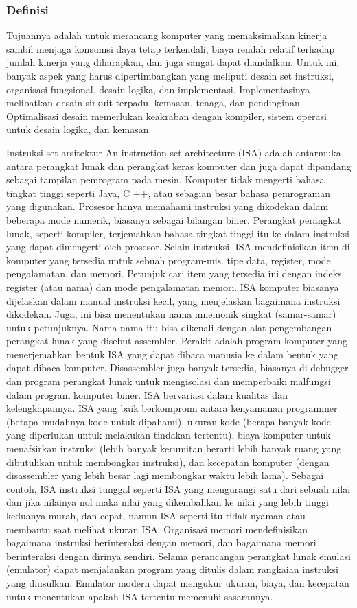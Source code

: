 {\subsubsection{Definisi}
Tujuannya adalah untuk merancang komputer yang memaksimalkan kinerja sambil menjaga konsumsi daya tetap terkendali, biaya rendah relatif terhadap jumlah kinerja yang diharapkan, dan juga sangat dapat diandalkan. Untuk ini, banyak aspek yang harus dipertimbangkan yang meliputi desain set instruksi, organisasi fungsional, desain logika, dan implementasi. Implementasinya melibatkan desain sirkuit terpadu, kemasan, tenaga, dan pendinginan. Optimalisasi desain memerlukan keakraban dengan kompiler, sistem operasi untuk desain logika, dan kemasan.

Instruksi set arsitektur 
An instruction set architecture (ISA) adalah antarmuka antara perangkat lunak dan perangkat keras komputer dan juga dapat dipandang sebagai tampilan pemrogram pada mesin. Komputer tidak mengerti bahasa tingkat tinggi seperti Java, C ++, atau sebagian besar bahasa pemrograman yang digunakan. Prosesor hanya memahami instruksi yang dikodekan dalam beberapa mode numerik, biasanya sebagai bilangan biner. Perangkat perangkat lunak, seperti kompiler, terjemahkan bahasa tingkat tinggi itu ke dalam instruksi yang dapat dimengerti oleh prosesor.
Selain instruksi, ISA mendefinisikan item di komputer yang tersedia untuk sebuah program-mis. tipe data, register, mode pengalamatan, dan memori. Petunjuk cari item yang tersedia ini dengan indeks register (atau nama) dan mode pengalamatan memori.
ISA komputer biasanya dijelaskan dalam manual instruksi kecil, yang menjelaskan bagaimana instruksi dikodekan. Juga, ini bisa menentukan nama mnemonik singkat (samar-samar) untuk petunjuknya. Nama-nama itu bisa dikenali dengan alat pengembangan perangkat lunak yang disebut assembler. Perakit adalah program komputer yang menerjemahkan bentuk ISA yang dapat dibaca manusia ke dalam bentuk yang dapat dibaca komputer. Disassembler juga banyak tersedia, biasanya di debugger dan program perangkat lunak untuk mengisolasi dan memperbaiki malfungsi dalam program komputer biner.
ISA bervariasi dalam kualitas dan kelengkapannya. ISA yang baik berkompromi antara kenyamanan programmer (betapa mudahnya kode untuk dipahami), ukuran kode (berapa banyak kode yang diperlukan untuk melakukan tindakan tertentu), biaya komputer untuk menafsirkan instruksi (lebih banyak kerumitan berarti lebih banyak ruang yang dibutuhkan untuk membongkar instruksi), dan kecepatan komputer (dengan disassembler yang lebih besar lagi membongkar waktu lebih lama). Sebagai contoh, ISA instruksi tunggal seperti ISA yang mengurangi satu dari sebuah nilai dan jika nilainya nol maka nilai yang dikembalikan ke nilai yang lebih tinggi keduanya murah, dan cepat, namun ISA seperti itu tidak nyaman atau membantu saat melihat ukuran ISA. Organisasi memori mendefinisikan bagaimana instruksi berinteraksi dengan memori, dan bagaimana memori berinteraksi dengan dirinya sendiri.
Selama perancangan perangkat lunak emulasi (emulator) dapat menjalankan program yang ditulis dalam rangkaian instruksi yang diusulkan. Emulator modern dapat mengukur ukuran, biaya, dan kecepatan untuk menentukan apakah ISA tertentu memenuhi sasarannya.
}
